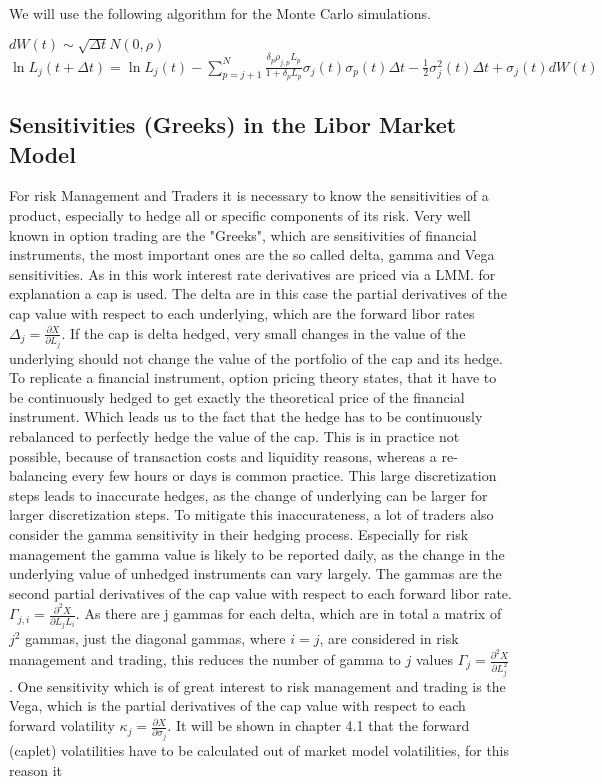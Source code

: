 \documentclass[11pt]{article}
\numberwithin{equation}{subsection}
\begin{document}
\newpage
We will use the following algorithm for the Monte Carlo simulations.
\begin{algorithmic}
	\STATE \(dW(t) \sim \sqrt{\Delta t} N(0, \rho) \)
	\STATE \(\ln L_j(t+\Delta t) = \ln L_j(t) - \sum_{p=j+1}^{N} \frac{\delta_{p} \rho_{j, p} L_p}{1 + \delta_{p}L_p} \sigma_{j}(t) \sigma_{p}(t) \Delta t - \frac{1}{2} \sigma_{j}^{2}(t) \Delta t + \sigma_{j}(t) dW(t) \)
	\ENDFOR			
	\ENDFOR	
	\ENDFOR
\end{algorithmic}

\subsection{Sensitivities (Greeks) in the Libor Market Model}
For risk Management and Traders it is necessary to know the sensitivities of a product, especially to hedge all or specific components of its risk. Very well known in option trading are the "Greeks", which are sensitivities of financial instruments, the most important ones are the so called delta, gamma and Vega sensitivities. As in this work interest rate derivatives are priced via a LMM. for explanation a cap is used. The delta are in this case the partial derivatives of the cap value with respect to each underlying, which are the forward libor rates  \(\Delta_j = \frac{\partial X}{\partial L_j}\). If the cap is delta hedged, very small changes in the value of the underlying should not change the value of the portfolio of the cap and its hedge. To replicate a financial instrument, option pricing theory states, that it have to be continuously hedged to get exactly the theoretical price of the financial instrument. Which leads us to the fact that the hedge has to be continuously rebalanced to perfectly hedge the value of the cap. This is in practice not possible, because of transaction costs and liquidity reasons, whereas a re-balancing every few hours or days is common practice. This large discretization steps leads to inaccurate hedges, as the change of underlying can be larger for larger discretization steps. To mitigate this inaccurateness, a lot of traders also consider the gamma sensitivity in their hedging process. Especially for risk management the gamma value is likely to be reported daily, as the change in the underlying value of unhedged instruments can vary largely. The gammas are the second partial derivatives of the cap value with respect to each forward libor rate. \(\Gamma_{j,i}=\frac{\partial^2 X}{\partial L_j L_i}\). As there are j gammas for each delta, which are in total a matrix of \(j^2\) gammas, just the diagonal gammas, where \(i=j\), are considered in risk management and trading, this reduces the number of gamma to \(j\) values \(\Gamma_{j}=\frac{\partial^2 X}{\partial L_j^2}\). One sensitivity which is of great interest to risk management and trading is the Vega, which is the partial derivatives of the cap value with respect to each forward volatility \(\kappa_j=\frac{\partial X}{\partial \sigma_{j}}\). It will be shown in chapter 4.1 that the forward (caplet) volatilities have to be calculated out of market model volatilities, for this reason it 
\end{document}
